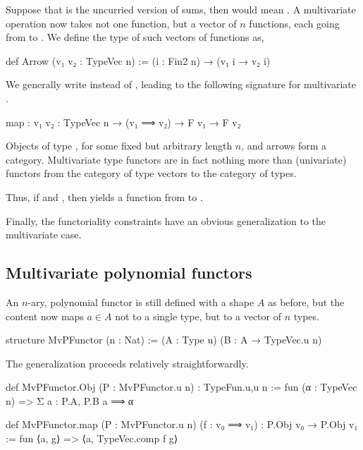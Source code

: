 Suppose that  is the uncurried version of sums, then  would mean .
A multivariate  operation now takes not one function, but a vector of $n$ functions, each going from  to . We define the type of such vectors of functions as,
\begin{leancode}    
    def Arrow (v₁ v₂ : TypeVec n) := (i : Fin2 n) → (v₁ i → v₂ i)
\end{leancode}  
We generally write  instead of , leading to the following signature
for multivariate .

\begin{leancode}
    map : {v₁ v₂ : TypeVec n} → (v₁ ⟹ v₂) → F v₁ → F v₂
\end{leancode}
\begin{remark}
    Objects of type , for some fixed but arbitrary length $n$, and arrows  form a category. 
    Multivariate type functors are in fact nothing more than (univariate) functors from the category of type vectors to the category of types.
\end{remark}

Thus, if  and , then  yields a function from  to .

Finally, the functoriality constraints have an obvious generalization to the multivariate case.

\subsection*{Multivariate polynomial functors}
An $n$-ary, polynomial functor is still defined with a shape $A$ as before, but the content now maps $a ∈ A$ not to a single type, but to a vector of $n$ types.

\begin{leancode}
    structure MvPFunctor (n : Nat) := (A : Type u) (B : A → TypeVec.{u} n)
\end{leancode}

The generalization proceeds relatively straightforwardly.
\begin{leancode}
    def MvPFunctor.Obj (P : MvPFunctor.{u} n) : TypeFun.{u,u} n
        := fun (α : TypeVec n) => Σ a : P.A, P.B a ⟹ α

    def MvPFunctor.map  (P : MvPFunctor.{u} n) 
                        (f : v₀ ⟹ v₁) 
                            : P.Obj v₀ → P.Obj v₁ 
        := fun ⟨a, g⟩ => ⟨a, TypeVec.comp f g⟩
\end{leancode}


